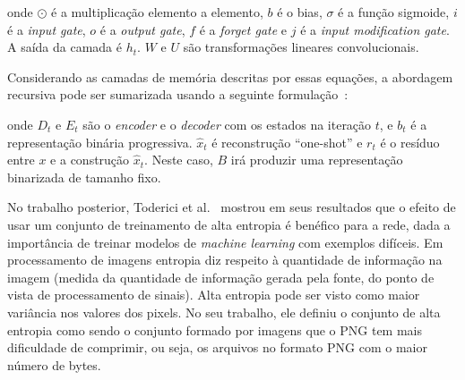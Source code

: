 
\noindent onde $\odot$ é a multiplicação elemento a elemento, $b$ é o bias, $\sigma$ é a função sigmoide, $i$ é a \textit{input gate}, $o$ é a \textit{output gate}, $f$ é a \textit{forget gate} e $j$ é a \textit{input modification gate}. A saída da camada é $h_t$. $W$ e $U$ são transformações lineares convolucionais.

Considerando as camadas de memória descritas por essas equações, a abordagem recursiva pode ser sumarizada usando a seguinte formulação~\cite{FullResolution2017Toderici}:

\noindent onde $D_t$ e $E_t$ são o \textit{encoder} e o \textit{decoder} com os estados na iteração $t$, e $b_t$ é a representação binária progressiva. $\hat{x}_t$ é reconstrução ``one-shot'' e $r_t$ é o resíduo entre $x$ e a construção $\hat{x}_t$. Neste caso, $B$ irá produzir uma representação binarizada de tamanho fixo.

No trabalho posterior, Toderici et al.~\cite{FullResolution2017Toderici} mostrou em seus resultados que o efeito de usar um conjunto de treinamento de alta entropia é benéfico para a rede, dada a importância de treinar modelos de \textit{machine learning} com exemplos difíceis. Em processamento de imagens entropia diz respeito à quantidade de informação na imagem (medida da quantidade de informação gerada pela fonte, do ponto de vista de processamento de sinais). Alta entropia pode ser visto como maior variância nos valores dos pixels. No seu trabalho, ele definiu o conjunto de alta entropia como sendo o conjunto formado por imagens que o \acrshort{PNG} tem mais dificuldade de comprimir, ou seja, os arquivos no formato \acrshort{PNG} com o maior número de bytes. 


